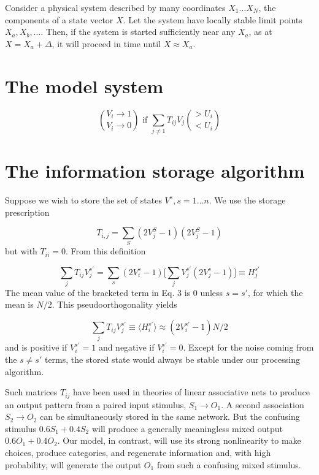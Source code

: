 \documentclass[10pt,letterpaper]{article}
\begin{document}
	Consider a physical system described by many coordinates $X_1 \dots X_N$, the components of a state vector $X$. Let the system have locally stable limit points $X_a, X_b, \dots$. Then, if the system is started sufficiently near any $X_a$, as at $X=X_a+\Delta$, it will proceed in time until $X\approx X_a$.
	
	\section{The model system}
	\begin{equation}
		\binom{V_i \to 1}{V_i \to 0} \text{ if } \sum_{j \neq 1} T_{ij}V_j \binom{>U_i}{<U_i}
	\end{equation}
	
	\section{The information storage algorithm}
	Suppose we wish to store the set of states $V^s, s=1 \dots n$. We use the storage prescription
	
	\begin{equation}
		T_{i,j}=\sum_{S}(2V_j^S-1)(2V_j^S-1)
	\end{equation}
	but with $T_{ii}=0$. From this definition
	
	\begin{equation}
		\sum_{j} T_{ij}V^{s'}_j = \sum_{s} (2V^s_i - 1) \bigg[ \sum_{j} V^{s'}_j (2V^s_j - 1) \bigg] \equiv H^{s'}_j
	\end{equation}
	The mean value of the bracketed term in Eq. 3 is 0 unless $s=s'$, for which the mean is $N/2$. This pseudoorthogonality yields 
	
	\begin{equation}
		\sum_{j} T_{ij}V^{s'}_j \equiv \langle H^{s'}_i \rangle \approx (2V^{s'}_i - 1)N/2
	\end{equation}
	and is positive if $V^{s'}_i=1$ and negative if $V^{s'}_i=0$. Except for the noise coming from the $s \neq s'$ terms, the stored state would always be stable under our processing algorithm.
	
	Such matrices $T_{ij}$ have been used in theories of linear associative nets to produce an output pattern from a paired input stimulus, $S_1 \to O_1$. A second association $S_2 \to O_2$ can be simultaneously stored in the same network. But the confusing stimulus $0.6S_1 + 0.4S_2$ will produce a generally meaningless mixed output $0.6O_1 + 0.4O_2$. Our model, in contrast, will use its strong nonlinearity to make choices, produce categories, and regenerate information and, with high probability, will generate the output $O_1$ from such a confusing mixed stimulus.
	
\end{document}
